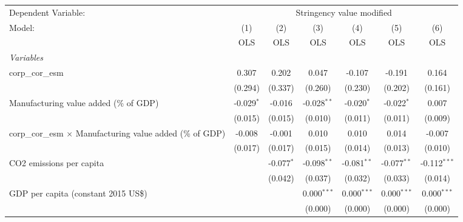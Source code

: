 
\begingroup
\centering
\begin{tabular}{lcccccc}
   \toprule
   Dependent Variable: & \multicolumn{6}{c}{Stringency value modified}\\
   Model:                                                            & (1)          & (2)          & (3)           & (4)           & (5)           & (6)\\  
                                                                     &  OLS         & OLS          & OLS           & OLS           & OLS           & OLS\\  
   \midrule
   \emph{Variables}\\
   corp\_cor\_esm                                                    & 0.307        & 0.202        & 0.047         & -0.107        & -0.191        & 0.164\\   
                                                                     & (0.294)      & (0.337)      & (0.260)       & (0.230)       & (0.202)       & (0.161)\\   
   Manufacturing value added (\% of GDP)                             & -0.029$^{*}$ & -0.016       & -0.028$^{**}$ & -0.020$^{*}$  & -0.022$^{*}$  & 0.007\\   
                                                                     & (0.015)      & (0.015)      & (0.010)       & (0.011)       & (0.011)       & (0.009)\\   
   corp\_cor\_esm $\times$ Manufacturing value added (\% of GDP)     & -0.008       & -0.001       & 0.010         & 0.010         & 0.014         & -0.007\\   
                                                                     & (0.017)      & (0.017)      & (0.015)       & (0.014)       & (0.013)       & (0.010)\\   
   CO2 emissions per capita                                          &              & -0.077$^{*}$ & -0.098$^{**}$ & -0.081$^{**}$ & -0.077$^{**}$ & -0.112$^{***}$\\   
                                                                     &              & (0.042)      & (0.037)       & (0.032)       & (0.033)       & (0.014)\\   
   GDP per capita (constant 2015 US\$)                               &              &              & 0.000$^{***}$ & 0.000$^{***}$ & 0.000$^{***}$ & 0.000$^{***}$\\   
                                                                     &              &              & (0.000)       & (0.000)       & (0.000)       & (0.000)\\   

\end{tabular}
